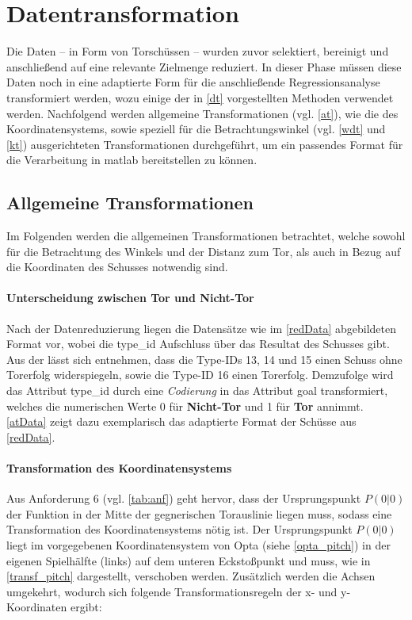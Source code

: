 \section{Datentransformation}
\label{dt}
Die Daten -- in Form von Torschüssen -- wurden zuvor selektiert, bereinigt und anschließend auf eine relevante Zielmenge reduziert. In dieser Phase müssen diese Daten noch in eine adaptierte Form für die anschließende Regressionsanalyse transformiert werden, wozu einige der in \vref{dt} vorgestellten Methoden verwendet werden. Nachfolgend werden allgemeine Transformationen (vgl. \vref{at}), wie die des Koordinatensystems, sowie speziell für die Betrachtungswinkel (vgl. \vref{wdt} und \vref{kt}) ausgerichteten Transformationen durchgeführt, um ein passendes Format für die Verarbeitung in \gls{matlab} bereitstellen zu können.


\subsection{Allgemeine Transformationen}
\label{at}
Im Folgenden werden die allgemeinen Transformationen betrachtet, welche sowohl für die Betrachtung des Winkels und der Distanz zum Tor, als auch in Bezug auf die Koordinaten des Schusses notwendig sind.

\paragraph{Unterscheidung zwischen Tor und Nicht-Tor} Nach der Datenreduzierung liegen die Datensätze wie im \vref{redData} abgebildeten Format vor, wobei die \textsf{type\_id} Aufschluss über das Resultat des Schusses gibt. Aus der  lässt sich entnehmen, dass die Type-IDs \textsf{13, 14} und \textsf{15} einen Schuss ohne Torerfolg widerspiegeln, sowie die Type-ID \textsf{16} einen Torerfolg. Demzufolge wird das Attribut \textsf{type\_id} durch eine \textit{Codierung} in das Attribut \textsf{goal} transformiert, welches die numerischen Werte \textsf{0} für \textbf{Nicht-Tor} und \textsf{1} für \textbf{Tor} annimmt. \vref{atData} zeigt dazu exemplarisch das adaptierte Format der Schüsse aus \vref{redData}.

\paragraph{Transformation des Koordinatensystems}
Aus Anforderung 6 (vgl. \vref{tab:anf}) geht hervor, dass der Ursprungspunkt $P(0|0)$ der Funktion in der Mitte der gegnerischen Torauslinie liegen muss, sodass eine Transformation des Koordinatensystems nötig ist. Der Ursprungspunkt $P(0|0)$ liegt im  vorgegebenen Koordinatensystem von Opta (siehe \vref{opta_pitch}) in der eigenen Spielhälfte (links) auf dem unteren Eckstoßpunkt und muss, wie in \vref{transf_pitch} dargestellt, verschoben werden. Zusätzlich werden die Achsen umgekehrt, wodurch sich folgende Transformationsregeln der x- und y-Koordinaten ergibt:\enlargethispage{\baselineskip}\newline

